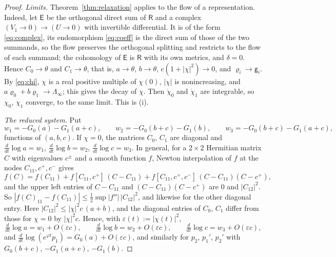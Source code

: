 \begin{proof}
\emph{Limits.} Theorem~\ref{thm:relaxation} applies to the flow of a
representation. Indeed, let $\mathsf E$ be the orthogonal direct sum of
$\mathsf R$ and a complex $(V_1\to0)\to(U\to0)$ with invertible differential.
It is of the form \eqref{eq:complex}, its endomorphism \eqref{eq:coeff} is
the direct sum of those of the two summands, so the flow preserves the
orthogonal splitting and restricts to the flow of each summand; the
cohomology of $\mathsf E$ is $\mathsf R$ with its own metrics, and
$\delta=0$. Hence $C_0\to\theta$ and $C_1\to\theta$, that is, $a\to\theta$,
$b\to\theta$, $c(1+|\chi|^2)\to0$, and $\varrho_i\to\mathsf g_i$. By
\eqref{eq:chi}, $\chi$ is a real positive multiple of $\chi(0)$, $|\chi|$ is
nonincreasing, and $a\varrho_0+b\varrho_1\to\Lambda_\infty$; this gives the
decay of $\chi$. Then
$\dot\chi_0$ and $\dot\chi_1$ are integrable, so $\chi_0$, $\chi_1$ converge,
to the same limit. This is (i).

\emph{The reduced system.} Put
\[
 w_1=-G_0(a)-G_1(a+c),\qquad w_2=-G_0(b+c)-G_1(b),\qquad
 w_3=-G_0(b+c)-G_1(a+c),
\]
functions of $(a,b,c)$. If $\chi=0$, the matrices $C_0$, $C_1$ are diagonal
and $\frac d{dt}\log a=w_1$, $\frac d{dt}\log b=w_2$,
$\frac d{dt}\log c=w_3$. In general, for a $2\times2$ Hermitian matrix $C$
with eigenvalues $c^\pm$ and a smooth function $f$, Newton interpolation of
$f$ at the nodes $C_{11},c^+,c^-$ gives
\[
 f(C)=f(C_{11})+f[C_{11},c^+]\,(C-C_{11})+f[C_{11},c^+,c^-]\,(C-C_{11})(C-c^+),
\]
and the upper left entries of $C-C_{11}$ and $(C-C_{11})(C-c^+)$ are $0$ and
$|C_{12}|^2$. So $|f(C)_{11}-f(C_{11})|\leq\frac12\sup|f''|\,|C_{12}|^2$, and
likewise for the other diagonal entry. Here $|C_{12}|^2\leq|\chi|^2c\,(a+b)$,
and the diagonal entries of $C_0$, $C_1$ differ from those for $\chi=0$ by
$|\chi|^2c$. Hence, with
$\varepsilon(t):=|\chi(t)|^2$,
\begin{equation}\label{eq:reduced}
 \tfrac d{dt}\log a=w_1+O(\varepsilon c),\qquad
 \tfrac d{dt}\log b=w_2+O(\varepsilon c),\qquad
 \tfrac d{dt}\log c=w_3+O(\varepsilon c),
\end{equation}
and $\frac d{dt}\log(e^{\varphi t}p_1)=G_0(a)+O(\varepsilon c)$, and similarly
for $p_2$, $p_1'$, $p_2'$ with $G_0(b+c)$, $-G_1(a+c)$, $-G_1(b)$.


\end{proof}
